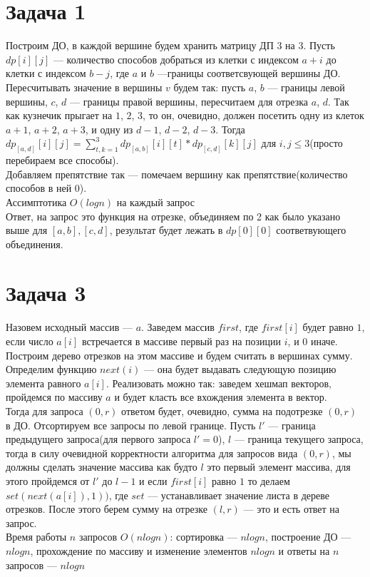 \documentclass{article}
\begin{document}
 
\noindent 
\onehalfspacing  

\section{Задача 1}
Построим ДО, в каждой вершине будем хранить матрицу ДП 3 на 3. Пусть $dp[i][j]$ --- количество способов добраться из клетки с индексом $a+i$ до клетки с индексом $b-j$, где $a$ и $b$ ---границы соответсвующей вершины ДО.\\
Пересчитывать значение в вершины $v$ будем так: пусть $a$, $b$ --- границы левой вершины, $c$, $d$ --- границы правой вершины, пересчитаем для отрезка $a$, $d$. Так как кузнечик прыгает на $1$, $2$, $3$, то он, очевидно, должен посетить одну из клеток $a+1$, $a+2$, $a+3$, и одну из $d-1$, $d-2$, $d-3$. Тогда $dp_{[a,d]}[i][j]=\sum_{t,k=1}^{3} dp_{[a,b]}[i][t]*dp_{[c,d]}[k][j]$ для $i,j \leq 3$(просто перебираем все способы).\\
 Добавляем препятствие так --- помечаем вершину как препятствие(количество способов в ней 0).\\
Ассимптотика $O(logn)$ на каждый запрос\\
Ответ, на запрос это функция на отрезке, объединяем по 2 как было указано выше для $[a,b], [c,d]$, результат будет лежать в $dp[0][0]$ соответвующего объединения.

\section{Задача 3}
Назовем исходный массив --- $a$. Заведем массив $first$, где $first[i]$ будет равно $1$, если число $a[i]$ встречается в массиве первый раз на позиции $i$, и $0$ иначе. Построим дерево отрезков на этом массиве и будем считать в вершинах сумму.\\
Определим функцию $next(i)$ --- она будет выдавать следующую позицию элемента равного $a[i]$. Реализовать можно так: заведем хешмап векторов, пройдемся по массиву $a$ и будет класть все вхождения элемента в вектор.\\
Тогда для запроса $(0,r)$ ответом будет, очевидно, сумма на подотрезке $(0,r)$ в ДО. Отсортируем все запросы по левой границе. Пусть $l'$ --- граница предыдущего запроса(для первого запроса $l'=0$), $l$ --- граница текущего запроса, тогда в силу очевидной корректности алгоритма для запросов вида $(0,r)$, мы должны сделать значение массива как будто $l$ это первый элемент массива, для этого пройдемся от $l'$ до $l-1$ и если $first[i]$ равно $1$ то делаем $set(next(a[i]),1))$, где $set$ --- устанавливает значение листа в дереве отрезков. После этого берем сумму на отрезке $(l, r)$ --- это и есть ответ на запрос.\\
Время работы $n$ запросов $O(nlogn)$: сортировка --- $nlogn$, построение ДО --- $nlogn$, прохождение по массиву и изменение элементов $nlogn$ и ответы на $n$ запросов --- $nlogn$ 
\end{document}
